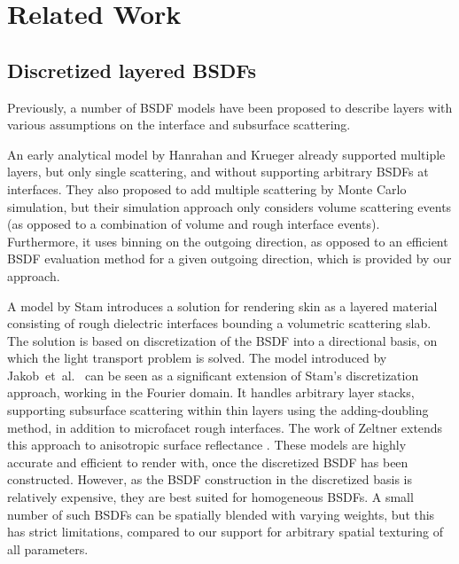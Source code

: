 \section{Related Work}
\label{sec:related}



\subsection{Discretized layered BSDFs}
Previously, a number of BSDF models have been proposed to describe layers with various assumptions on the interface and subsurface scattering.

An early analytical model by Hanrahan and Krueger  already supported multiple layers, but only single scattering, and without supporting arbitrary BSDFs at interfaces. They also proposed to add multiple scattering by Monte Carlo simulation, but their simulation approach only considers volume scattering events (as opposed to a combination of volume and rough interface events). Furthermore, it uses binning on the outgoing direction, as opposed to an efficient BSDF evaluation method for a given outgoing direction, which is provided by our approach.

A model by Stam  introduces a solution for rendering skin as a layered material consisting of rough dielectric interfaces bounding a volumetric scattering slab. The solution is based on discretization of the BSDF into a directional basis, on which the light transport problem is solved. The model introduced by Jakob~et~al.~ can be seen as a significant extension of Stam's discretization approach, working in the Fourier domain. It handles arbitrary layer stacks, supporting subsurface scattering within thin layers using the adding-doubling method, in addition to microfacet rough interfaces. The work of Zeltner extends this approach to anisotropic surface reflectance . These models are highly accurate and efficient to render with, once the discretized BSDF has been constructed. However, as the BSDF construction in the discretized basis is relatively expensive, they are best suited for homogeneous BSDFs. A small number of such BSDFs can be spatially blended with varying weights, but this has strict limitations, compared to our support for arbitrary spatial texturing of all parameters.

